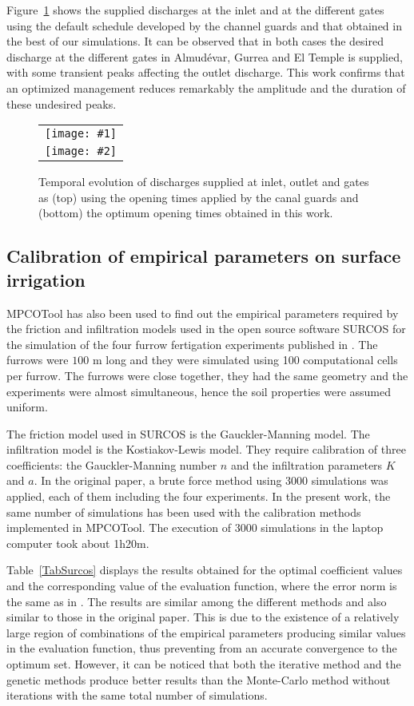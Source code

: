 \documentclass[review,authoryear]{elsarticle}
\newcommand{\FIGII}[4]
{
	\begin{figure}[ht!]
		\centering
		\begin{tabular}{c}
			\texttt{[image: \#1]} \\ \texttt{[image: \#2]}
		\end{tabular}
		\caption{#3.\label{#4}}
	\end{figure}
}
\begin{document}
Figure~\ref{FigSwigs} shows the supplied discharges at the inlet and at the different
gates using the default schedule developed by the channel guards and that 
obtained in the best of our simulations. It can be observed that in both cases 
the desired discharge at the different gates in Almudévar, Gurrea and El Temple is supplied,
with some transient peaks affecting the outlet discharge.
This work confirms that an optimized management reduces remarkably the amplitude and the duration of these undesired peaks.

\FIGII{Violada-contributions.eps}{Violada-optimized-contributions.eps}
{Temporal evolution of discharges supplied at inlet, outlet and gates as (top)
using the opening times applied by the canal guards and (bottom) the optimum
opening times obtained in this work}{FigSwigs}

\subsection{Calibration of empirical parameters on surface irrigation}

MPCOTool has also been used to find out the empirical parameters required by the friction and infiltration
models used in the open source software SURCOS \citep{Surcos,SurcosGit,JaviSurcos3} for the simulation of the four furrow fertigation experiments published in \citet{JaviSurcos2}. The furrows were $100$ m long and they were simulated using 100 computational cells per furrow. The furrows were close together, they had the same geometry and the experiments were almost simultaneous, hence the soil properties were assumed uniform. 

The friction model used in SURCOS is the Gauckler-Manning model. The infiltration model is the Kostiakov-Lewis model. They require calibration of three coefficients: the Gauckler-Manning number $n$ and the infiltration parameters $K$ and $a$. In the original paper, a brute force method using 3000 simulations was applied, each of them including the four experiments. In the present work, the same number of simulations has been used with the calibration methods implemented in MPCOTool. The execution of 3000 simulations in the laptop computer took about 1h20m.  

Table~\ref{TabSurcos} displays the results obtained for the optimal coefficient values and the corresponding
value of the evaluation function, where the error norm is the same as in \citet{JaviSurcos2}. The results are similar among the different methods and also similar to those in the original paper. This is due to the existence of a relatively large region of combinations of the empirical parameters producing similar values in the evaluation function, thus preventing from an accurate convergence to the optimum set. However, it can be noticed that both the iterative method and the genetic methods produce better results than the Monte-Carlo method without iterations with the same total number of simulations.
\end{document}
